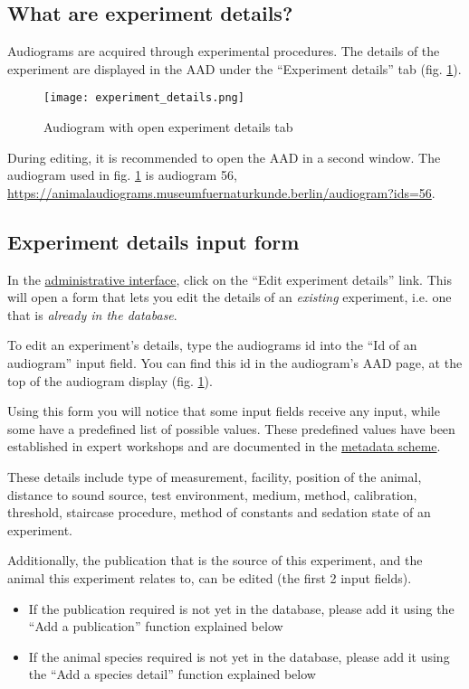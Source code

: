 \documentclass{article}
\begin{document}
\subsection{What are experiment details?}
Audiograms are acquired through experimental procedures. The details of the experiment are displayed in the AAD under the ``Experiment details'' tab (fig. \ref{fig:experiment_details}).

\begin{figure}
\texttt{[image: experiment\_details.png]}
\caption{Audiogram with open experiment details tab}
\label{fig:experiment_details}
\end{figure}

\begin{it}During editing, it is recommended to open the AAD in a second window. The audiogram used in fig. \ref{fig:experiment_details} is audiogram 56, \url{https://animalaudiograms.museumfuernaturkunde.berlin/audiogram?ids=56}.
\end{it}
\subsection{Experiment details input form}
In the \href{https://animalaudiograms.museumfuernaturkunde.berlin/admin/v1/start}{administrative interface}, click on the ``Edit experiment details'' link. This will open a form that lets you edit the details of an \emph{existing} experiment, i.e. one that is \emph{already in the database}.

To edit an experiment's details, type the audiograms id into the ``Id of an audiogram'' input field. You can find this id in the audiogram's AAD page, at the top of the audiogram display (fig. \ref{fig:experiment_details}).

Using this form you will notice that some input fields receive any input, while some have a predefined list of possible values. These predefined values have been established in expert workshops and are documented in the \href{https://github.com/MfN-Berlin/AnimalAudiogramDatabase/blob/main/resources/metadata/audiogram_metadata_scheme.md}{metadata scheme}.

These details include type of measurement, facility, position of the animal, distance to sound source, test environment, medium, method, calibration, threshold, staircase procedure, method of constants and sedation state of an experiment. 

Additionally, the publication that is the source of this experiment, and the animal this experiment relates to, can be edited (the first 2 input fields).
\begin{itemize}
\item{If the publication required is not yet in the database, please add it using the ``Add a publication'' function explained below}
\item{If the animal species required is not yet in the database, please add it using the ``Add a species detail'' function explained below}
\end{itemize}
\end{document}
